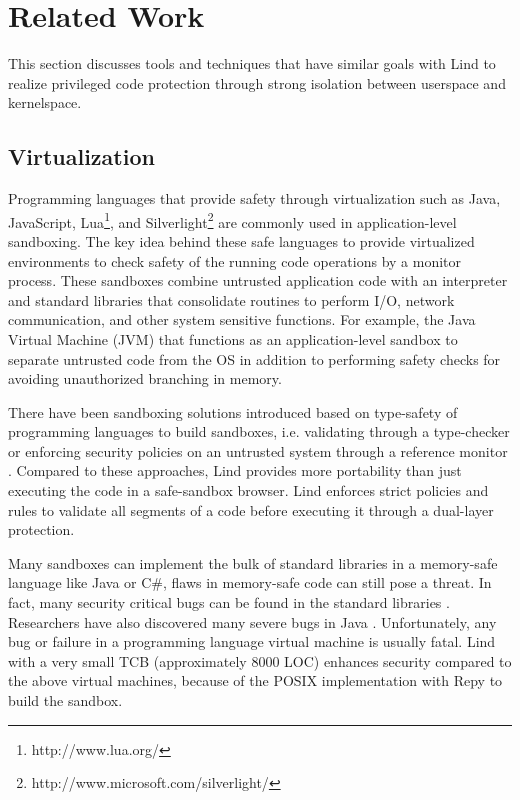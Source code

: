 \section{Related Work}
\label{sec.related_work}

This section discusses tools and techniques that have similar goals with Lind to realize privileged code protection through strong isolation between userspace and kernelspace.

	
\subsection{Virtualization}

Programming languages that provide safety through virtualization such as Java, JavaScript, Lua\footnote{http://www.lua.org/}, and Silverlight\footnote{http://www.microsoft.com/silverlight/} are commonly used in application-level sandboxing. The key idea behind these safe languages to provide virtualized environments to check safety of the running code operations by a monitor process. These sandboxes combine untrusted application code with an interpreter and standard libraries that consolidate routines to perform I/O, network communication, and other system sensitive functions. For example, the Java Virtual Machine (JVM) \cite{JVM} that functions as an application-level sandbox to separate untrusted code from the OS in addition to performing safety checks for avoiding unauthorized branching in memory. 

There have been sandboxing solutions introduced based on type-safety of programming languages to build sandboxes, i.e. validating through a type-checker \cite{JS-Sandboxing} or enforcing security policies on an untrusted system through a reference monitor \cite{JS-Sandboxing1}. Compared to these approaches, Lind provides more portability than just executing the code in a safe-sandbox browser. Lind enforces strict policies and rules to validate all segments of a code before executing it through a dual-layer protection.

Many sandboxes can implement the bulk of standard libraries in a memory-safe language like Java or C\#, flaws in memory-safe code can still pose a threat. In fact, many security critical bugs can be found in the standard libraries \cite{JavaBugs}. Researchers have also discovered many severe bugs in Java \cite{Java-Lessons}. Unfortunately, any bug or failure in a programming language virtual machine is usually fatal. Lind with a very small TCB (approximately 8000 LOC) enhances security compared to the above virtual machines, because of the POSIX implementation with Repy to build the sandbox.

